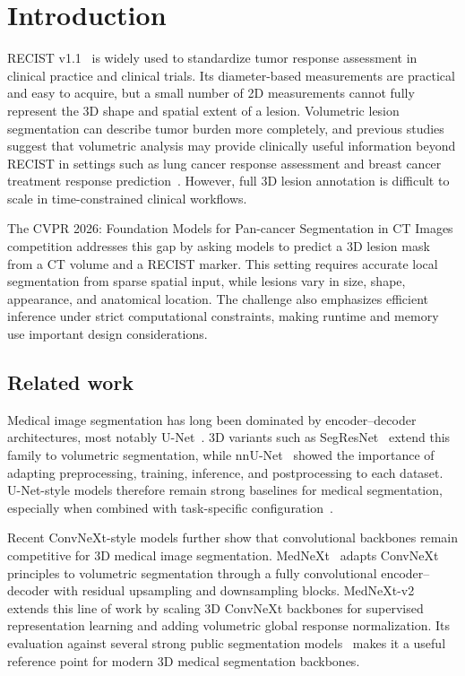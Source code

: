 \section{Introduction}

RECIST v1.1~\cite{eisenhauerNewResponseEvaluation2009} is widely used to standardize tumor response assessment in clinical practice and clinical trials. Its diameter-based measurements are practical and easy to acquire, but a small number of 2D measurements cannot fully represent the 3D shape and spatial extent of a lesion. Volumetric lesion segmentation can describe tumor burden more completely, and previous studies suggest that volumetric analysis may provide clinically useful information beyond RECIST in settings such as lung cancer response assessment and breast cancer treatment response prediction~\cite{hayesComparisonCTVolumetric2016,machadoPromptableCTFoundation2025}. However, full 3D lesion annotation is difficult to scale in time-constrained clinical workflows.

The CVPR 2026: Foundation Models for Pan-cancer Segmentation in CT Images competition addresses this gap by asking models to predict a 3D lesion mask from a CT volume and a RECIST marker. This setting requires accurate local segmentation from sparse spatial input, while lesions vary in size, shape, appearance, and anatomical location. The challenge also emphasizes efficient inference under strict computational constraints, making runtime and memory use important design considerations.

\subsection{Related work}

Medical image segmentation has long been dominated by encoder--decoder architectures, most notably U-Net~\cite{ronnebergerUNetConvolutionalNetworks2015}. 3D variants such as SegResNet~\cite{myronenko3DMRIBrain2018} extend this family to volumetric segmentation, while nnU-Net~\cite{isenseeNnUNetSelfadaptingFramework2018} showed the importance of adapting preprocessing, training, inference, and postprocessing to each dataset. U-Net-style models therefore remain strong baselines for medical segmentation, especially when combined with task-specific configuration~\cite{maFastLowResourceAccurate2026}.

Recent ConvNeXt-style models further show that convolutional backbones remain competitive for 3D medical image segmentation. MedNeXt~\cite{royMedNeXtTransformerDrivenScaling2023} adapts ConvNeXt~\cite{liuConvNet2020s2022} principles to volumetric segmentation through a fully convolutional encoder--decoder with residual upsampling and downsampling blocks. MedNeXt-v2~\cite{royMedNeXtv2Scaling3D2025} extends this line of work by scaling 3D ConvNeXt backbones for supervised representation learning and adding volumetric global response normalization. Its evaluation against several strong public segmentation models~\cite{wasserthalTotalSegmentatorRobustSegmentation2023,hantzeMRSegmentatorMultiModalitySegmentation2025,heVISTA3DUnifiedSegmentation2024,duSegVolUniversalInteractive2025,huangSTUNetScalableTransferable2023} makes it a useful reference point for modern 3D medical segmentation backbones.

